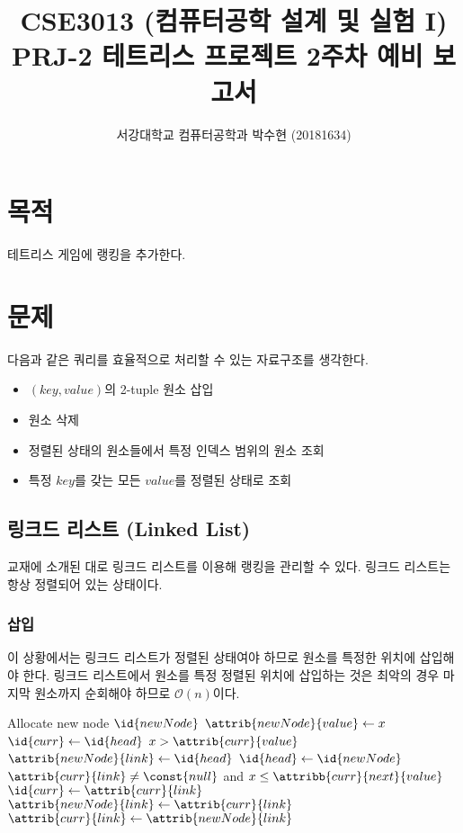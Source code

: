 
    
\usepackage{subfig}



\title{CSE3013 (컴퓨터공학 설계 및 실험 I) \space \newline PRJ-2 테트리스 프로젝트 2주차 예비 보고서}
\author{서강대학교 컴퓨터공학과 박수현 (20181634)}
\maketitle

\section{목적}
테트리스 게임에 랭킹을 추가한다.

\section{문제}
다음과 같은 쿼리를 효율적으로 처리할 수 있는 자료구조를 생각한다.
\begin{itemize}
    \item $(key, value)$의 2-tuple 원소 삽입
    \item 원소 삭제
    \item 정렬된 상태의 원소들에서 특정 인덱스 범위의 원소 조회
    \item 특정 $key$를 갖는 모든 $value$를 정렬된 상태로 조회
\end{itemize}

\subsection{링크드 리스트 (Linked List)}
교재에 소개된 대로 링크드 리스트를 이용해 랭킹을 관리할 수 있다. 링크드 리스트는 항상 정렬되어 있는 상태이다.

\subsubsection{삽입} 이 상황에서는 링크드 리스트가 정렬된 상태여야 하므로 원소를 특정한 위치에 삽입해야 한다.
링크드 리스트에서 원소를 특정 정렬된 위치에 삽입하는 것은 최악의 경우 마지막 원소까지 순회해야 하므로 $\mathcal{O}\left(n\right)$이다.

\begin{codebox}
\li Allocate new node $\id{newNode}$
\li $\attrib{newNode}{value} \gets x$
\li $\id{curr} \gets \id{head}$
\li \If $x > \attrib{curr}{value}$ \Then
\li     $\attrib{newNode}{link} \gets \id{head}$
\li     $\id{head} \gets \id{newNode}$
\li \Else
\li     \While $\attrib{curr}{link} \neq \const{null}$ and $x \leq \attribb{curr}{next}{value}$ \Do
\li         $\id{curr} \gets \attrib{curr}{link}$
        \End
\li $\attrib{newNode}{link} \gets \attrib{curr}{link}$
\li $\attrib{curr}{link} \gets\attrib{newNode}{link}$
    \End
\end{codebox}

